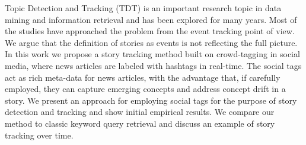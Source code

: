 Topic Detection and Tracking (TDT) is an important research topic in data mining and information retrieval and has been explored for many years. Most of the studies have approached the problem from the event tracking point of view. We argue that the definition of stories as events is not reflecting the full picture. In this work we propose a story tracking method built on crowd-tagging in social media, where news articles are labeled with hashtags in real-time. The social tags act as rich meta-data for news articles, with the advantage that, if carefully employed, they can capture emerging concepts and address concept drift in a story. We present an approach for employing social tags for the purpose of story detection and tracking and show initial empirical results. We compare our method to classic keyword query retrieval and discuss an example of story tracking over time.
